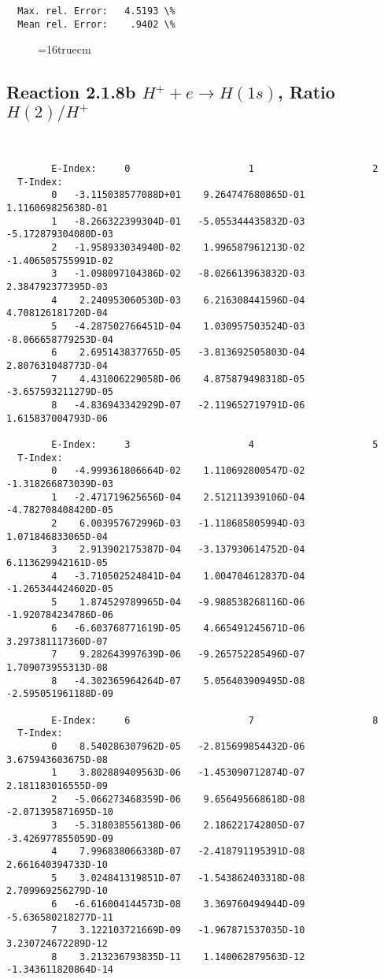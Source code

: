 \documentclass[12pt,dvipdfmx]{article}
\begin{document}
{\begin{small}
\begin{verbatim}
  Max. rel. Error:   4.5193 \%
  Mean rel. Error:    .9402 \%

\end{verbatim}\end{small}
\begin{figure} \label{2.1.8ra}
\epsfxsize=16truecm
\end{figure}
\newpage



\subsection{
Reaction 2.1.8b  $H^+ + e \rightarrow H(1s) $,  Ratio $H(2)/H^+$
}

\begin{small}\begin{verbatim}


        E-Index:     0                     1                     2
  T-Index:
        0   -3.115038577088D+01    9.264747680865D-01    1.116069825638D-01
        1   -8.266322399304D-01   -5.055344435832D-03   -5.172879304080D-03
        2   -1.958933034940D-02    1.996587961213D-02   -1.406505755991D-02
        3   -1.098097104386D-02   -8.026613963832D-03    2.384792377395D-03
        4    2.240953060530D-03    6.216308441596D-04    4.708126181720D-04
        5   -4.287502766451D-04    1.030957503524D-03   -8.066658779253D-04
        6    2.695143837765D-05   -3.813692505803D-04    2.807631048773D-04
        7    4.431006229058D-06    4.875879498318D-05   -3.657593211279D-05
        8   -4.836943342929D-07   -2.119652719791D-06    1.615837004793D-06

        E-Index:     3                     4                     5
  T-Index:
        0   -4.999361806664D-02    1.110692800547D-02   -1.318266873039D-03
        1   -2.471719625656D-04    2.512113939106D-04   -4.782708408420D-05
        2    6.003957672996D-03   -1.118685805994D-03    1.071846833065D-04
        3    2.913902175387D-04   -3.137930614752D-04    6.113629942161D-05
        4   -3.710502524841D-04    1.004704612837D-04   -1.265344424602D-05
        5    1.874529789965D-04   -9.988538268116D-06   -1.920784234786D-06
        6   -6.603768771619D-05    4.665491245671D-06    3.297381117360D-07
        7    9.282643997639D-06   -9.265752285496D-07    1.709073955313D-08
        8   -4.302365964264D-07    5.056403909495D-08   -2.595051961188D-09

        E-Index:     6                     7                     8
  T-Index:
        0    8.540286307962D-05   -2.815699854432D-06    3.675943603675D-08
        1    3.802889409563D-06   -1.453090712874D-07    2.181183016555D-09
        2   -5.066273468359D-06    9.656495668618D-08   -2.071395871695D-10
        3   -5.318038556138D-06    2.186221742805D-07   -3.426977855059D-09
        4    7.996838066338D-07   -2.418791195391D-08    2.661640394733D-10
        5    3.024841319851D-07   -1.543862403318D-08    2.709969256279D-10
        6   -6.616004144573D-08    3.369760494944D-09   -5.636580218277D-11
        7    3.122103721669D-09   -1.967871537035D-10    3.230724672289D-12
        8    3.213236793835D-11    1.140062879563D-12   -1.343611820864D-14


\end{verbatim}
\end{small}}
\end{document}
